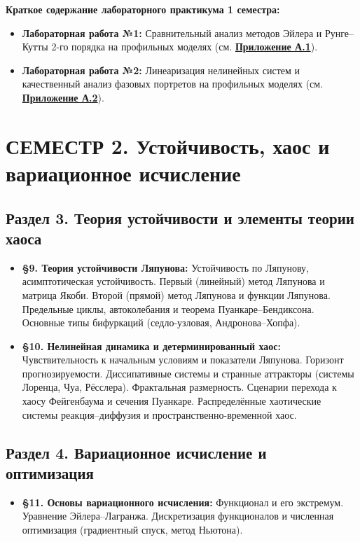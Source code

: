 \documentclass[12pt]{article}
\begin{document}
\begin{greenblock}
\textbf{Краткое содержание лабораторного практикума 1 семестра:}
\begin{itemize}[nosep]
    \item \textbf{Лабораторная работа №1:} Сравнительный анализ методов Эйлера и Рунге--Кутты 2-го порядка на профильных моделях (см. \hyperref[app:A1]{\textbf{Приложение А.1}}).
    \item \textbf{Лабораторная работа №2:} Линеаризация нелинейных систем и качественный анализ фазовых портретов на профильных моделях (см. \hyperref[app:A2]{\textbf{Приложение А.2}}).
\end{itemize}
\end{greenblock}

\newpage
\section*{СЕМЕСТР 2. Устойчивость, хаос и вариационное исчисление}

\subsection*{Раздел 3. Теория устойчивости и элементы теории хаоса}
\begin{itemize}[nosep]
    \item \textbf{§9. Теория устойчивости Ляпунова:} Устойчивость по Ляпунову, асимптотическая устойчивость. Первый (линейный) метод Ляпунова и матрица Якоби. Второй (прямой) метод Ляпунова и функции Ляпунова. Предельные циклы, автоколебания и теорема Пуанкаре--Бендиксона. Основные типы бифуркаций (седло-узловая, Андронова--Хопфа).
    \item \textbf{§10. Нелинейная динамика и детерминированный хаос:} Чувствительность к начальным условиям и показатели Ляпунова. Горизонт прогнозируемости. Диссипативные системы и странные аттракторы (системы Лоренца, Чуа, Рёсслера). Фрактальная размерность. Сценарии перехода к хаосу Фейгенбаума и сечения Пуанкаре. Распределённые хаотические системы реакция--диффузия и пространственно-временной хаос.
\end{itemize}

\subsection*{Раздел 4. Вариационное исчисление и оптимизация}
\begin{itemize}[nosep]
    \item \textbf{§11. Основы вариационного исчисления:} Функционал и его экстремум. Уравнение Эйлера--Лагранжа. Дискретизация функционалов и численная оптимизация (градиентный спуск, метод Ньютона).
\end{itemize}
\end{document}
